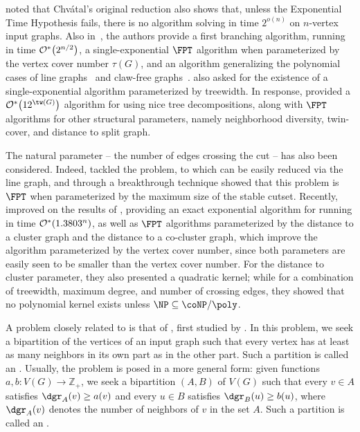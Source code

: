 \cite{matching_cut_tcs} noted that Chv\'atal's original reduction also shows that, unless the Exponential Time Hypothesis fails, there is no algorithm solving  in time $2^{o(n)}$ on $n$-vertex input graphs.
Also in~\citep{matching_cut_tcs}, the authors provide a first branching algorithm, running in time $\mathcal{O}^*\!\left(2^{n/2}\right)$, a single-exponential $\FPT$ algorithm when parameterized by the vertex cover number $\tau(G)$, and an algorithm generalizing the polynomial cases of line graphs~\citep{matching_cut_moshi} and claw-free graphs~\citep{matching_cut_planar}.
\cite{matching_cut_tcs} also asked for the existence of a single-exponential algorithm parameterized by treewidth.
In response, \cite{matching_cut_structural} provided a $\bigOs{12^{\tw(G)}}$ algorithm for  using nice tree decompositions, along with $\FPT$ algorithms for other structural parameters, namely neighborhood diversity, twin-cover, and distance to split graph.

The natural parameter -- the number of edges crossing the cut -- has also been considered.
Indeed, \cite{marx_treewidth_reduction} tackled the  problem, to which  can be easily reduced via the line graph, and through a breakthrough technique showed that this problem is $\FPT$ when parameterized by the maximum size of the stable cutset.
Recently, \cite{matching_cut_ipec} improved on the results of \cite{matching_cut_tcs}, providing an exact exponential algorithm for  running in  time $\mathcal{O}^*\!\left(1.3803^n\right)$, as well as $\FPT$ algorithms parameterized by the distance to a cluster graph and the distance to a co-cluster graph, which improve the algorithm parameterized by the vertex cover number, since both parameters are easily seen to be smaller than the vertex cover number.
For the distance to cluster parameter, they also presented a quadratic kernel; while for a combination of treewidth, maximum degree, and number of crossing edges, they showed that no polynomial kernel exists unless $\NP \subseteq \coNP/\poly$.

A problem  closely related to  is that of , first studied by \cite{internal_partition_thomassen}.
In this problem, we seek a bipartition of the vertices of an input graph such that every vertex has at least as many neighbors in its
own part as in the other part. Such a partition is called an .
Usually, the problem is posed in a more general form: given functions $a,b: V(G) \rightarrow \mathbb{Z}_+$, we seek a bipartition $(A,B)$ of $V(G)$ such that every $v \in A$ satisfies $\dgr_A(v) \geq a(v)$ and every $u \in B$ satisfies $\dgr_B(u) \geq b(u)$, where $\dgr_A(v)$ denotes the number of neighbors of $v$ in the set $A$. Such a partition is called an .

